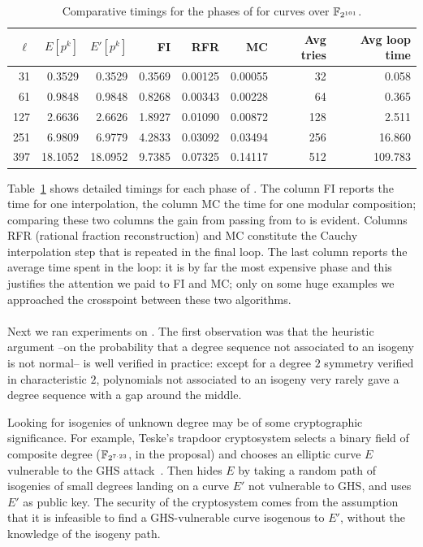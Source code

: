 \begin{table}
  \centering
  \begin{tabular}{r r r r r r r r}
    \hline
    $\ell$ & $E[p^k]$ & $E'[p^k]$ & FI & RFR & MC & Avg tries & Avg loop time\\
    \hline
    31  &  0.3529 &  0.3529 & 0.3569 & 0.00125 & 0.00055 &  32 &   0.058\\
    61  &  0.9848 &  0.9848 & 0.8268 & 0.00343 & 0.00228 &  64 &   0.365\\
    127 &  2.6636 &  2.6626 & 1.8927 & 0.01090 & 0.00872 & 128 &   2.511\\
    251 &  6.9809 &  6.9779 & 4.2833 & 0.03092 & 0.03494 & 256 &  16.860\\
    397 & 18.1052 & 18.0952 & 9.7385 & 0.07325 & 0.14117 & 512 & 109.783\\
  \end{tabular}
  \caption{Comparative timings for the phases of \ctwoasfimc{} for curves over $\mathbb{F}_{2^{101}}$.}
  \label{tab:C2}
\end{table}

Table~\ref{tab:C2} shows detailed timings for each phase of
\ctwoasfimc{}. The column FI reports the time for one interpolation, the
column MC the time for one modular composition; comparing these two
columns the gain from passing from \ctwoasfi{} to \ctwoasfimc{} is
evident. Columns RFR (rational fraction reconstruction) and MC
constitute the Cauchy interpolation step that is repeated in the final
loop. The last column reports the average time spent in the loop: it
is by far the most expensive phase and this justifies the attention we
paid to FI and MC; only on some huge examples we approached the
crosspoint between these two algorithms.


\paragraph{\ctwoud{}}
\label{sec:c2-ud}
Next we ran experiments on \ctwoud{}. The first observation was that the
heuristic argument --on the probability that a degree sequence not
associated to an isogeny is not normal-- is well verified in practice:
except for a degree $2$ symmetry verified in characteristic $2$,
polynomials not associated to an isogeny very rarely gave a degree
sequence with a gap around the middle.

Looking for isogenies of unknown degree may be of some cryptographic
significance. For example, Teske's trapdoor cryptosystem selects a
binary field of composite degree ($\mathbb{F}_{2^{7\cdot 23}}$, in the
proposal) and chooses an elliptic curve $E$ vulnerable to the GHS
attack~\cite{gaudry+hess+smart02}. Then hides $E$ by taking a random
path of isogenies of small degrees landing on a curve $E'$ not
vulnerable to GHS, and uses $E'$ as public key. The security of the
cryptosystem comes from the assumption that it is infeasible to find a
GHS-vulnerable curve isogenous to $E'$, without the knowledge of the
isogeny path. 

